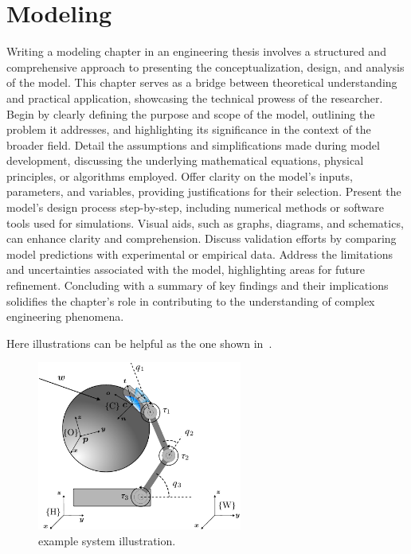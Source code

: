 
\chapter{Modeling} \label{ch:modeling}

Writing a modeling chapter in an engineering thesis involves a structured and comprehensive approach to presenting the conceptualization, design, and analysis of the model. This chapter serves as a bridge between theoretical understanding and practical application, showcasing the technical prowess of the researcher. Begin by clearly defining the purpose and scope of the model, outlining the problem it addresses, and highlighting its significance in the context of the broader field. Detail the assumptions and simplifications made during model development, discussing the underlying mathematical equations, physical principles, or algorithms employed. Offer clarity on the model's inputs, parameters, and variables, providing justifications for their selection. Present the model's design process step-by-step, including numerical methods or software tools used for simulations. Visual aids, such as graphs, diagrams, and schematics, can enhance clarity and comprehension. Discuss validation efforts by comparing model predictions with experimental or empirical data. Address the limitations and uncertainties associated with the model, highlighting areas for future refinement. Concluding with a summary of key findings and their implications solidifies the chapter's role in contributing to the understanding of complex engineering phenomena. \medskip

Here illustrations can be helpful as the one shown in~.

%
\begin{figure}[h]
	\begin{small}
		\begin{center}
			\includegraphics[width=0.6\textwidth]{chapters/modeling/fig/sys-schematic-reversed-crop.pdf}
		\end{center}
		\caption{example system illustration.}
		\label{fig:sys-schematic}
	\end{small}
\end{figure}
